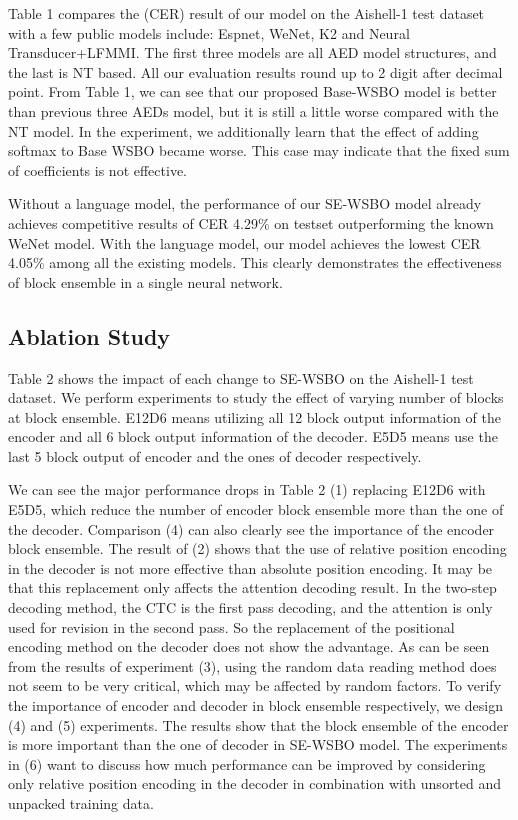 \documentclass[a4paper]{article}
\begin{document}
Table 1 compares the (CER) result of our model on the Aishell-1 test dataset with a few public models include: Espnet\cite{Watanabe2018ESPnetES}, WeNet\cite{Yao2021WeNetPO}, K2\cite{k2} and
Neural Transducer+LFMMI\cite{Tian2021ConsistentTA}. The first three models are all AED model structures, and the last is NT based. All our evaluation results round up to 2 digit after decimal point. 
From Table 1, we can see that our proposed Base-WSBO model is better than previous three AEDs model, but it is still a little worse compared with the NT model. In the experiment, we additionally learn that the effect of adding softmax to Base WSBO became worse. This case may indicate that the fixed sum of coefficients is not effective.

Without a language model, the performance of our
SE-WSBO model already achieves competitive results of CER 4.29\%
on testset outperforming the known WeNet model.  With
the language model, our model achieves the lowest CER 4.05\% among all the existing models. This clearly demonstrates the effectiveness of block ensemble in a single neural network.



\subsection{Ablation Study}
Table 2 shows the impact of each change to SE-WSBO on the Aishell-1 test dataset. We perform experiments to study the effect of varying number of blocks at block ensemble. E12D6 means utilizing all 12 block output information of the encoder and all 6 block output information of the decoder. E5D5 means use the last 5 block output of encoder and the ones of decoder respectively.   

We can see the major performance drops in Table 2 (1) replacing E12D6 with E5D5, which reduce the number of encoder block ensemble more than the one of the decoder. Comparison (4) can also clearly see the importance of the encoder block ensemble. The result of (2) shows that the use of relative position encoding in the decoder is not more effective than absolute position encoding. It may be that this replacement only affects the attention decoding result. In the two-step decoding method, the CTC is the first pass decoding, and the attention is only used for revision in the second pass. So the replacement of the positional encoding method on the decoder does not show the advantage. As can be seen from the results of experiment (3), using the random data reading method does not seem to be very critical, which may be affected by random factors. To verify the importance of encoder and decoder in block ensemble respectively, we design (4) and (5) experiments. The results show that the block ensemble of the encoder is more important than the one of decoder in SE-WSBO model. The experiments in (6) want to discuss how much performance can be improved by considering only relative position encoding in the decoder in combination with unsorted and unpacked training data.
\end{document}
